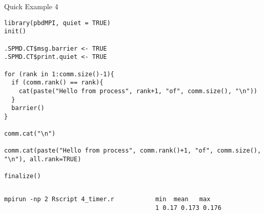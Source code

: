 \begin{frame}
  \begin{exampleblock}{Quick Example 4}
  \centering
\begin{lstlisting}[title=Timing: timer.r]
library(pbdMPI, quiet = TRUE)
init()

.SPMD.CT$msg.barrier <- TRUE
.SPMD.CT$print.quiet <- TRUE

for (rank in 1:comm.size()-1){
  if (comm.rank() == rank){
    cat(paste("Hello from process", rank+1, "of", comm.size(), "\n"))
  }
  barrier()
}

comm.cat("\n")

comm.cat(paste("Hello from process", comm.rank()+1, "of", comm.size(), "\n"), all.rank=TRUE)

finalize()
\end{lstlisting}
  \begin{columns}[t,onlytextwidth]
    \begin{column}{0.58\textwidth}
\begin{lstlisting}[backgroundcolor=\color{white},keywordstyle=\color{black},title=Execute this script via:]
mpirun -np 2 Rscript 4_timer.r
\end{lstlisting}
    \end{column}
    \hfill
    \begin{column}{0.4\textwidth}
\begin{lstlisting}[title=Sample Output:]
   min  mean   max
1 0.17 0.173 0.176
\end{lstlisting}
    \end{column}
​  \end{columns}
  \end{exampleblock}
\end{frame}



